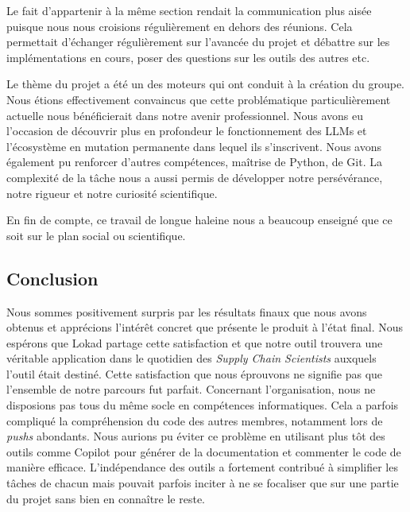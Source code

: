 Le fait d'appartenir à la même section rendait la communication plus aisée puisque nous nous croisions régulièrement en dehors des réunions. Cela permettait d'échanger régulièrement sur l'avancée du projet et débattre sur les implémentations en cours, poser des questions sur les outils des autres etc.

Le thème du projet a été un des moteurs qui ont conduit à la création du groupe. Nous étions effectivement convaincus que cette problématique particulièrement actuelle nous bénéficierait dans notre avenir professionnel. Nous avons eu l'occasion de découvrir plus en profondeur le fonctionnement des LLMs et l'écosystème en mutation permanente dans lequel ils s'inscrivent. Nous avons également pu renforcer d'autres compétences, maîtrise de Python, de Git.
La complexité de la tâche nous a aussi permis de développer notre persévérance, notre rigueur et notre curiosité scientifique.

En fin de compte, ce travail de longue haleine nous a beaucoup enseigné que ce soit sur le plan social ou scientifique.

\subsection{Conclusion}
Nous sommes positivement surpris par les résultats finaux que nous avons obtenus et apprécions l'intérêt concret que présente le produit à l'état final. Nous espérons que Lokad partage cette satisfaction et que notre outil trouvera une véritable application dans le quotidien des \textit{Supply Chain Scientists} auxquels l'outil était destiné.
Cette satisfaction que nous éprouvons ne signifie pas que l'ensemble de notre parcours fut parfait. Concernant l'organisation, nous ne disposions pas tous du même socle en compétences informatiques. Cela a parfois compliqué la compréhension du code des autres membres, notamment lors de \textit{pushs} abondants. Nous aurions pu éviter ce problème en utilisant plus tôt des outils comme Copilot pour générer de la documentation et commenter le code de manière efficace. L'indépendance des outils a fortement contribué à simplifier les tâches de chacun mais pouvait parfois inciter à ne se focaliser que sur une partie du projet sans bien en connaître le reste.